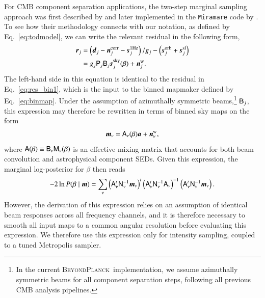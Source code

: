 \documentclass[onecolumn]{aa}
\renewcommand{\d}[0]{\vec{d}}
\newcommand{\A}[0]{\tens{A}}
\newcommand{\n}[0]{\vec{n}}
\newcommand{\s}[0]{\vec{s}}
\renewcommand{\a}[0]{\vec{a}}
\newcommand{\m}[0]{\vec{m}}
\newcommand{\B}[0]{\tens{B}}
\newcommand{\N}[0]{\tens{N}}
\newcommand{\M}[0]{\tens{M}}
\renewcommand{\r}[0]{\vec{r}}
\renewcommand{\P}[0]{\tens{P}}
\newcommand{\BP}{\textsc{BeyondPlanck}}
\begin{document}
For CMB component separation applications, the two-step marginal
sampling approach was first described by \citet{stompor:2008} and
later implemented in the \texttt{Miramare} code by \citet{stivoli:2010}. To see
how their methodology connects with our notation, as defined by
Eq.~\eqref{eq:todmodel}, we can write the relevant residual in the
following form,
\begin{align}
    \nonumber
    \r_j &= \left(\d_j - \n_j^{\mathrm{corr}} - \s_j^{\mathrm{1Hz}}\right)/g_j -
\left(\s_j^{\mathrm{orb}} + \s_j^{\mathrm{sl}}\right)
    \\
    &= g_j\P_j\B_j\s_j^{\mathrm{sky}}(\beta) +
\n_j^{\mathrm{w}}.
\label{eq:beta_res}
\end{align}
The left-hand side in this equation is identical to the residual in
Eq.~\eqref{eq:res_bin1}, which is the input to the binned mapmaker
defined by Eq.~\eqref{eq:binmap}. Under the assumption of azimuthally
symmetric beams,\footnote{In the current \BP\ implementation, we assume
  azimuthally symmetric beams for all component separation steps,
  following all previous CMB analysis pipelines.} $\B_j$, this
expression may therefore be rewritten in terms of binned sky maps on
the form
\begin{equation}
  \m_{\nu} = \A_{\nu}(\beta)\a +\n^{\mathrm{w}}_{\nu},
  \label{eq:beta_data}
\end{equation}
where $\A(\beta) \equiv \B_{\nu}\M_{\nu}(\beta)$ is an effective
mixing matrix that accounts for both beam convolution and
astrophysical component SEDs. Given this expression, the marginal
log-posterior for $\beta$ then reads \citep{stompor:2008}
\begin{equation}
-2\ln P(\beta\mid \m) = \sum_{\nu}\left(\A_{\nu}^t\N_{\nu}^{-1}\m_{\nu}\right)^t
\left(\A_{\nu}^t\N_{\nu}^{-1}\A_{\nu}\right)^{-1}\left(\A_{\nu}^t\N_{\nu}^{-1}\m_{\nu}\right).
\label{eq:beta_marg}
\end{equation}
However, the derivation of this expression relies on an assumption of
identical beam responses across all frequency channels, and it is
therefore necessary to smooth all input maps to a common angular
resolution before evaluating this expression. We therefore use
this expression only for intensity sampling, coupled to a tuned Metropolis
sampler.
\end{document}

